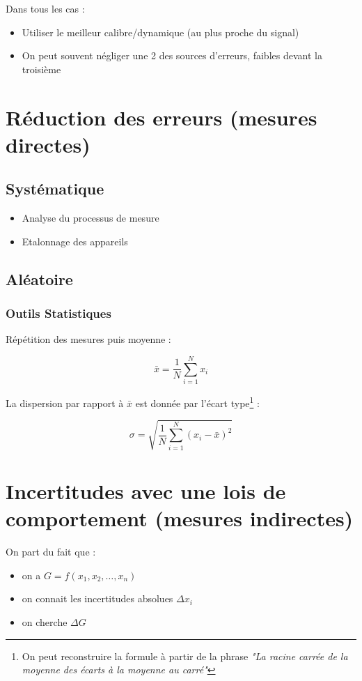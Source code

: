 \documentclass[a4paper, 11pt]{article}
\begin{document}
Dans tous les cas :
\begin{itemize}
    \item Utiliser le meilleur calibre/dynamique (au plus proche du signal)
    \item On peut souvent négliger une 2 des sources d'erreurs, faibles devant la troisième
\end{itemize}


\section{Réduction des erreurs (mesures directes)}
\subsection{Systématique}
\begin{itemize}
    \item Analyse du processus de mesure
    \item Etalonnage des appareils
\end{itemize}

\subsection{Aléatoire}
\subsubsection{Outils Statistiques}

Répétition des mesures puis moyenne :

$$\bar x = \frac{1}{N}\sum_{i=1}^{N}x_i$$

La dispersion par rapport à $\bar x$ est donnée par l'écart type\footnote{On peut reconstruire la formule à partir de la phrase {\it "La racine carrée de la moyenne des écarts à la moyenne au carré"}} :

$$\sigma = \sqrt{\frac{1}{N}\sum_{i=1}^{N}(x_i - \bar x)^2}$$

\section{Incertitudes avec une lois de comportement (mesures indirectes)}

On part du fait que :
\begin{itemize}
    \item on a $G = f(x_1, x_2,\ldots,x_n)$
    \item on connait les incertitudes absolues $\Delta x_i$
    \item on cherche $\Delta G$
\end{itemize}
\end{document}

